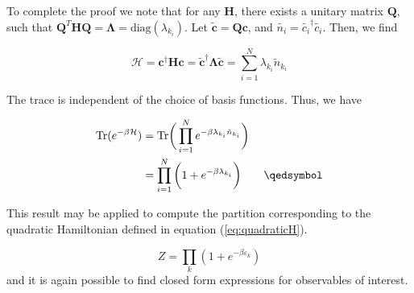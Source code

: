 \documentclass[10pt, twocolumn, twoside]{article}
\begin{document}
To complete the proof we note that for any $\bm H$, there exists a unitary matrix $\bm Q$, such that $\bm Q^T \bm H \bm Q = \bm \Lambda = \text{diag}(\lambda_{k_i})$. Let $\tilde{\bm c} = \bm Q \bm c$, and $\tilde{n_i} = \tilde{c_i}^\dagger \tilde{c_i}$. Then, we find

\begin{equation*}
\mathcal{H} = \bm c^\dagger \bm H \bm c = \bm \tilde{\bm c}^\dagger \bm \Lambda \tilde{\bm c} = \sum_{i=1}^N \lambda_{k_i} \tilde{n}_{k_i}
\end{equation*}

The trace is independent of the choice of basis functions. Thus, we have

\begin{equation*}
\begin{split}
\text{Tr} ( e^{-\beta \mathcal{H} } ) &= \text{Tr} \bigg( \prod_{i=1}^N e^{-\beta \lambda_{k_i} \tilde{n}_{k_i} } \bigg) \\
&= \prod_{i=1}^N \bigg( 1 + e^{-\beta \lambda_{k_i} } \bigg) \quad\quad \qedsymbol
\end{split}
\end{equation*}

This result may be applied to compute the partition corresponding to the quadratic Hamiltonian defined in equation (\ref{eq:quadraticH}).

\begin{equation}
Z = \prod_k ( 1 + e^{-\beta \varepsilon_k} )
\end{equation}
and it is again possible to find closed form expressions for observables of interest.
\end{document}
